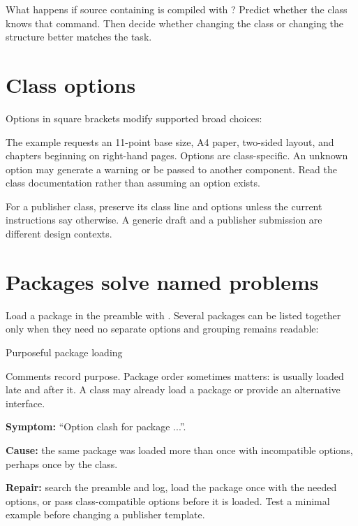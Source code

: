 \begin{pausepredict}
What happens if source containing  is compiled with
? Predict whether the class knows that command. Then decide
whether changing the class or changing the structure better matches the task.
\end{pausepredict}

\section{Class options}

Options in square brackets modify supported broad choices:


The example requests an 11-point base size, A4 paper, two-sided layout, and
chapters beginning on right-hand pages. Options are class-specific. An unknown
option may generate a warning or be passed to another component. Read the class
documentation rather than assuming an option exists.

For a publisher class, preserve its class line and options unless the current
instructions say otherwise. A generic draft and a publisher submission are
different design contexts.

\section{Packages solve named problems}

Load a package in the preamble with . Several packages can be
listed together only when they need no separate options and grouping remains
readable:

\begin{latexcode}{Purposeful package loading}
\usepackage{amsmath}  %
\usepackage{graphicx} %
\usepackage{booktabs} %
\end{latexcode}

Comments record purpose. Package order sometimes matters:  is
usually loaded late and  after it. A class may already load a
package or provide an alternative interface.

\begin{commonerror}
\textbf{Symptom:} ``Option clash for package ...''.

\textbf{Cause:} the same package was loaded more than once with incompatible
options, perhaps once by the class.

\textbf{Repair:} search the preamble and log, load the package once with the
needed options, or pass class-compatible options before it is loaded. Test a
minimal example before changing a publisher template.
\end{commonerror}

